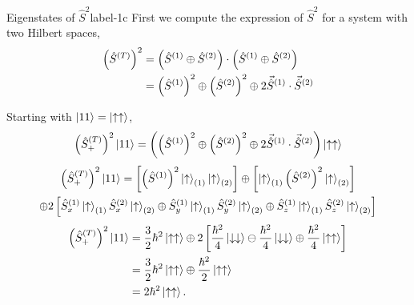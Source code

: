 \documentclass[../main.tex]{subfiles}
\begin{document}
\begin{sol}{Eigenstates of $\hat{S}^{2}$}{label-1c}
    First we compute the expression of $\hat{S}^{2}$ for a system with two Hilbert spaces,
    \begin{align*}
        \qty(\hat{S}^{(T)})^2 &= \qty(\hat{S}^{(1)}\oplus\hat{S}^{(2)})\cdot\qty(\hat{S}^{(1)}\oplus\hat{S}^{(2)}) \\
                          &= \qty(\hat{S}^{(1)})^2 \oplus \qty(\hat{S}^{(2)})^2 \oplus 2 \vec{\hat{S}}^{(1)}\cdot\vec{\hat{S}}^{(2)}
    \end{align*}

    Starting with $\ket{11} = \ket{\uparrow\uparrow}$,
    \begin{align*}
        \qty(\hat{S}_{+}^{(T)})^2\ket{11} &= \qty(\qty(\hat{S}^{(1)})^2 \oplus \qty(\hat{S}^{(2)})^2 \oplus 2 \vec{\hat{S}}^{(1)}\cdot\vec{\hat{S}}^{(2)})\ket{\uparrow\uparrow} \\
    \end{align*}
    \begin{multline*}
        \qty(\hat{S}_{+}^{(T)})^2\ket{11} = \left[
                                        \qty(\hat{S}^{(1)})^{2}\ket{\uparrow}_{(1)}\ket{\uparrow}_{(2)}
                                     \right]
                                     \oplus
                                     \left[
                                        \ket{\uparrow}_{(1)}\qty(\hat{S}^{(2)})^{2}\ket{\uparrow}_{(2)}
                                     \right]
                                     \\
                                    \oplus
                                    2\left[
                                        \hat{S}_{x}^{(1)}\ket{\uparrow}_{(1)}\hat{S}_{x}^{(2)}\ket{\uparrow}_{(2)} 
                                        \oplus
                                        \hat{S}_{y}^{(1)}\ket{\uparrow}_{(1)}\hat{S}_{y}^{(2)}\ket{\uparrow}_{(2)}
                                        \oplus
                                        \hat{S}_{z}^{(1)}\ket{\uparrow}_{(1)}\hat{S}_{z}^{(2)}\ket{\uparrow}_{(2)}
                                    \right]
    \end{multline*}
    \begin{align*}
        \qty(\hat{S}_{+}^{(T)})^2\ket{11} &= \frac{3}{2}\hbar^2\ket{\uparrow\uparrow} \oplus 2\left[\frac{\hbar^2}{4}\ket{\downarrow\downarrow}\ominus\frac{\hbar^2}{4}\ket{\downarrow\downarrow}\oplus\frac{\hbar^2}{4}\ket{\uparrow\uparrow}\right] \\
                                  &= \frac{3}{2}\hbar^2\ket{\uparrow\uparrow} \oplus \frac{\hbar^2}{2}\ket{\uparrow\uparrow} \\
                                  &= 2\hbar^2\ket{\uparrow\uparrow}.
    \end{align*}


\end{sol}
\end{document}
